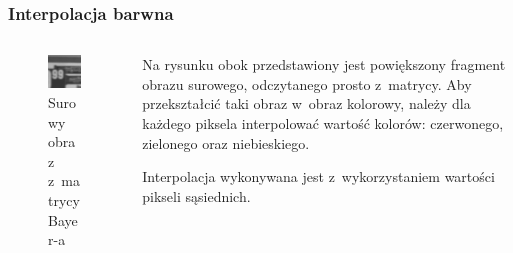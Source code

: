 \documentclass{beamer}
\begin{document}
\begin{frame}
	\frametitle{Interpolacja barwna}
	
	\begin{columns}
	\begin{column}{4cm}
    \begin{center}
    \begin{figure}

	  \includegraphics[width=\textwidth]{raw_image}
	  \caption{Surowy obraz z~matrycy Bayer-a}
	  \label{fig:raw_image}
    \end{figure}
    \end{center}
  \end{column}
  \begin{column}{6cm}
	Na rysunku obok przedstawiony jest powiększony fragment obrazu surowego, odczytanego prosto z~matrycy.
	Aby przekształcić taki obraz w~obraz kolorowy, należy dla każdego piksela interpolować wartość kolorów:
	{\color{red}czerwonego}, {\color{green}zielonego} oraz {\color{blue}niebieskiego}.
	
	Interpolacja wykonywana jest z~wykorzystaniem wartości pikseli sąsiednich.
  \end{column}
  \end{columns}
\end{frame}
\end{document}
